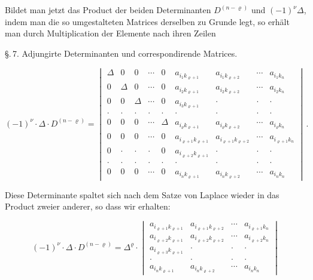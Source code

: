 Bildet man jetzt das Product der beiden Determinanten $D^{(n-\varrho)}$ und $(-1)^\nu\Delta$, indem man die so umgestalteten Matrices derselben zu Grunde legt, so erhält man durch Multiplication der Elemente nach ihren Zeilen


\S.\,7. Adjungirte Determinanten und correspondirende Matrices.

\[
(-1)^{\nu}\cdot \Delta \cdot D^{(n-\varrho)} =
\begin{vmatrix}
\Delta & 0 & 0 & \cdots & 0 & a_{i_1 k_{\varrho+1}} & a_{i_1 k_{\varrho+2}} & \cdots & a_{i_1 k_n} \\
0 & \Delta & 0 & \cdots & 0 & a_{i_2 k_{\varrho+1}} & a_{i_2 k_{\varrho+2}} & \cdots & a_{i_2 k_n} \\
0 & 0 & \Delta & \cdots & 0 & a_{i_3 k_{\varrho+1}} & \cdot & \cdot & \cdot \\
\cdot & \cdot & \cdot & \cdot & \cdot & \cdot & \cdot & \cdot & \cdot \\
0 & 0 & 0 & \cdots & \Delta & a_{i_\varrho k_{\varrho+1}} & a_{i_\varrho k_{\varrho+2}} & \cdots & a_{i_\varrho k_n} \\
0 & 0 & 0 & \cdots & 0 & a_{i_{\varrho+1} k_{\varrho+1}} & a_{i_{\varrho+1} k_{\varrho+2}} & \cdots & a_{i_{\varrho+1} k_n} \\
0 & \cdot & \cdot & \cdot & 0 & a_{i_{\varrho+2} k_{\varrho+1}} & \cdot & \cdot & \cdot \\
\cdot & \cdot & \cdot & \cdot & \cdot & \cdot & \cdot & \cdot & \cdot \\
0 & 0 & 0 & \cdots & 0 & a_{i_n k_{\varrho+1}} & a_{i_n k_{\varrho+2}} & \cdots & a_{i_n k_n}
\end{vmatrix}\, .
\]

Diese Determinante spaltet sich nach dem Satze von Laplace wieder in das Product zweier anderer, so dass wir erhalten:

\begin{equation*}
(-1)^{\nu}\cdot \Delta \cdot D^{(n-\varrho)} = \Delta^{\varrho}\cdot
\begin{vmatrix}
a_{i_{\varrho+1} k_{\varrho+1}} & a_{i_{\varrho+1} k_{\varrho+2}} & \cdots & a_{i_{\varrho+1} k_n} \\
a_{i_{\varrho+2} k_{\varrho+1}} & a_{i_{\varrho+2} k_{\varrho+2}} & \cdots & a_{i_{\varrho+2} k_n} \\
a_{i_{\varrho+3} k_{\varrho+1}} & \cdot & \cdot & \cdot \\
\cdot & \cdot & \cdot & \cdot \\
a_{i_n k_{\varrho+1}} & a_{i_n k_{\varrho+2}} & \cdots & a_{i_n k_n}
\end{vmatrix}
\tag{$A$}
\end{equation*}

